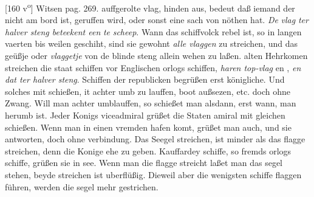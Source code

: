 [160 v\textsuperscript{o}] Witsen\protect{} pag. 269.  auffgerolte vlag\protect{}, hinden aus, bedeut daß iemand der nicht am bord ist, geruffen wird, oder sonst eine sach von n\"{o}then hat. \textit{De }\textit{vlag}\protect{}\textit{ ter halver steng beteekent een }\textit{ te }\textit{scheep}\protect{}. Wann das schiffvolck rebel ist, so in langen vaerten bis weilen geschiht, sind sie gewohnt \textit{alle vlaggen}\protect{} zu streichen, und das ge\"{u}ßje oder \textit{vlaggetje}\protect{} von de blinde steng\protect{} allein wehen zu laßen.  alten Hehrkomen streichen die staat schiffen\protect{} vor Englischen orlogs schiffen\protect{}, \textit{haren top-vlag}\protect{} en , \textit{en dat ter halver steng}\protect{}. Schiffen\protect{} der republicken begr\"{u}ßen erst k\"{o}nigliche. Und solches mit schießen, it achter umb zu lauffen, boot\protect{} außsezen, etc. doch ohne Zwang. Will man achter umblauffen, so schießet man alsdann, erst wann, man herumb ist. Jeder Konigs viceadmiral\protect{} gr\"{u}ßet die Staten amiral\protect{} mit gleichen schießen. Wenn man in einen vremden hafen\protect{} komt, gr\"{u}ßet man auch, und sie antworten, doch ohne verbindung. Das Seegel\protect{} streichen, ist minder als das flagge streichen, denn  die Konige ehe zu geben. Kauffardey schiffe\protect{}, so fremds orlogs schiffe\protect{},  gr\"{u}ßen sie in see. Wenn man die flagge\protect{} streicht laßet man das segel\protect{} stehen, beyde streichen ist uberfl\"{u}ßig. Dieweil aber die wenigsten schiffe\protect{} flaggen\protect{} f\"{u}hren, werden die segel\protect{} mehr gestrichen. 